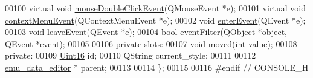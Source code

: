 \begin{DoxyCode}
00100     \textcolor{keyword}{virtual} \textcolor{keywordtype}{void} \hyperlink{a00024_a408a766481a987b9f165de7bd54a1a38}{mouseDoubleClickEvent}(QMouseEvent *e);
00101     \textcolor{keyword}{virtual} \textcolor{keywordtype}{void} \hyperlink{a00024_ac5ddce14c487d6bc720035cf338e8021}{contextMenuEvent}(QContextMenuEvent *e);
00102     \textcolor{keywordtype}{void} \hyperlink{a00024_ad7ad2fd0571f0f8486732f783802eb0e}{enterEvent}(QEvent *e);
00103     \textcolor{keywordtype}{void} \hyperlink{a00024_a40078aca597449b51938078628c695ae}{leaveEvent}(QEvent *e);
00104     \textcolor{keywordtype}{bool} \hyperlink{a00024_aec3191237e5d11f90059f9758173b544}{eventFilter}(QObject *\textcolor{keywordtype}{object}, QEvent *event);
00105 
00106 \textcolor{keyword}{private} slots:
00107     \textcolor{keywordtype}{void} moved(\textcolor{keywordtype}{int} value);
00108 \textcolor{keyword}{private}:
00109     \hyperlink{a00001_aae7407b021d43f7193a81a58cfb3e297}{Uint16} id;
00110     QString current\_style;
00111 
00112     \hyperlink{a00004}{emu\_data\_editor} * parent;
00113 
00114 \};
00115 
00116 \textcolor{preprocessor}{#endif // CONSOLE\_H}
\end{DoxyCode}
